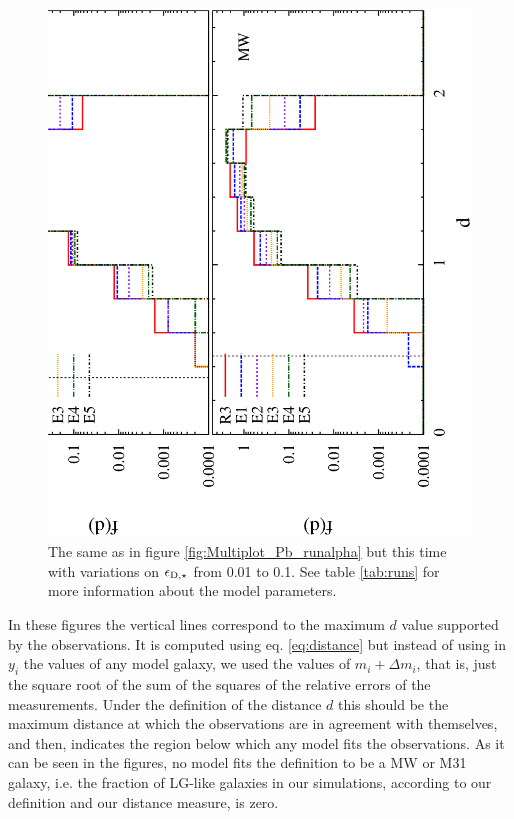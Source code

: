 \documentclass[useAMS,usenatbib]{mn2e}
\begin{document}
\begin{figure}
 \includegraphics[scale=0.33,angle=270]{figures/Multiplot_Pb_runeps.ps}
 \caption{The same as in figure \ref{fig:Multiplot_Pb_runalpha} but
   this time with variations on $\epsilon_{{\rm D},\star}$ from 0.01
   to 0.1. See table \ref{tab:runs} for more information about the
   model parameters.}
 \label{fig:Multiplot_Pb_runeps}
\end{figure}

In these figures the vertical lines correspond to the maximum $d$
value supported by the observations. It is computed using
eq. \ref{eq:distance} but instead of using in $y_i$ the values of any
model galaxy, we used the values of $m_i+\Delta m_i$, that is, just
the square root of the sum of the squares of the relative errors of
the measurements. Under the definition of the distance $d$ this should
be the maximum distance at which the observations are in agreement
with themselves, and then, indicates the region below which any model
fits the observations. As it can be seen in the figures, no model fits
the definition to be a MW or M31 galaxy, i.e. the fraction of LG-like
galaxies in our simulations, according to our definition and our
distance measure, is zero.
\end{document}

